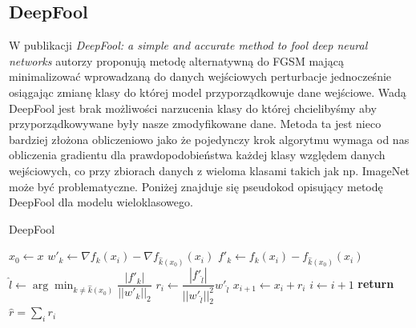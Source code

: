 \documentclass[
    left=2.5cm,         %
    right=2.5cm,        %
    top=2.5cm,          %
    bottom=3cm,         %
    bindingoffset=6mm,  %
    nohyphenation=false %
]{eiti/eiti-thesis}
\begin{document}
\subsection{DeepFool}
W publikacji \textit{DeepFool: a simple and accurate method to fool deep neural networks}\cite{DBLP:journals/corr/Moosavi-Dezfooli15}
autorzy proponują metodę alternatywną do FGSM mającą minimalizować wprowadzaną do danych wejściowych perturbacje jednocześnie
osiągając zmianę klasy do której model przyporządkowuje dane wejściowe.
Wadą DeepFool jest brak możliwości narzucenia klasy do której chcielibyśmy aby przyporządkowywane były nasze zmodyfikowane dane.
Metoda ta jest nieco bardziej złożona obliczeniowo jako że pojedynczy krok algorytmu wymaga od nas obliczenia gradientu dla
prawdopodobieństwa każdej klasy względem danych wejściowych, co przy zbiorach danych z wieloma klasami
takich jak np. ImageNet może być problematyczne. Poniżej znajduje się pseudokod opisujący metodę DeepFool dla modelu
wieloklasowego.
\begin{algorithm}
\caption{DeepFool}\label{DeepFool}
\begin{algorithmic}[1]
\State $x_0 \gets x$
    \State $w'_k\gets \nabla f_k(x_i) - \nabla f_{\hat{k}(x_0)}(x_i)$
    \State $f'_k\gets f_{k}(x_i) - f_{\hat{k}(x_0)}(x_i)$
\EndFor
\State $\hat{l}\gets \arg \min_{k\neq\hat{k}(x_0)} \dfrac{|f'_k|}{||w'_k||_2}$
\State $r_i\gets \dfrac{|f'_{\hat{l}}|}{||w'_{\hat{l}}||^2_2}w'_{\hat{l}}$
\State $x_{i+1}\gets x_i + r_i$
\State $i\gets i + 1$
\EndWhile
\State \textbf{return} $\hat{r} = \sum_{i} r_i$
\end{algorithmic}
\end{algorithm}
\end{document}
